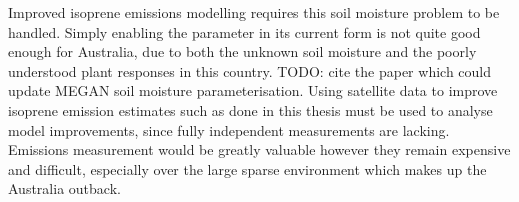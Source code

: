   Improved isoprene emissions modelling requires this soil moisture problem to be handled.
  Simply enabling the parameter in its current form is not quite good enough for Australia, due to both the unknown soil moisture and the poorly understood plant responses in this country.
  TODO: cite the paper which could update MEGAN soil moisture parameterisation.
  Using satellite data to improve isoprene emission estimates such as done in this thesis must be used to analyse model improvements, since fully independent measurements are lacking.
  Emissions measurement would be greatly valuable however they remain expensive and difficult, especially over the large sparse environment which makes up the Australia outback.
